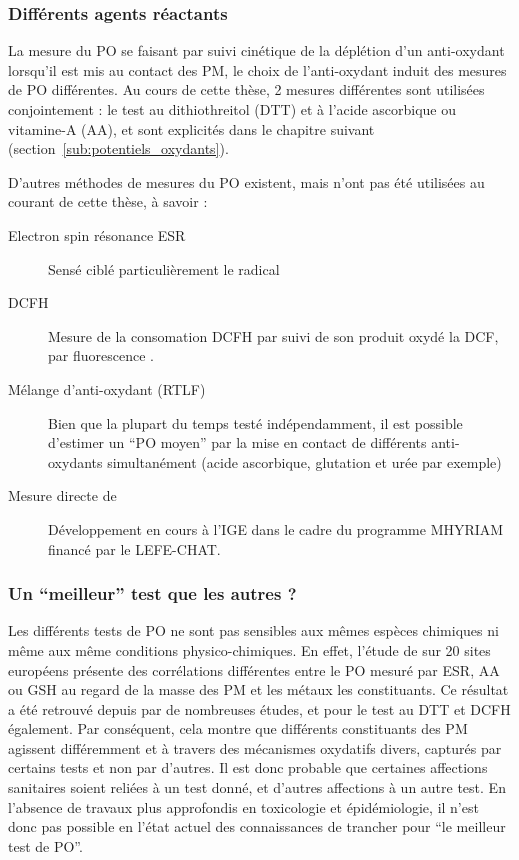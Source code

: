 \subsubsection{Différents agents réactants}%
\label{ssub:differents_agent_reactant}

La mesure du PO se faisant par suivi cinétique de la déplétion d'un anti-oxydant
lorsqu'il est mis au contact des PM, le choix de l'anti-oxydant induit des mesures de PO
différentes. Au cours de cette thèse, 2 mesures différentes sont utilisées conjointement :
le test au dithiothreitol (DTT) et à l'acide ascorbique ou vitamine-A (AA), et sont
explicités dans le chapitre suivant (section~\ref{sub:potentiels_oxydants}).

D'autres méthodes de mesures du PO existent, mais n'ont pas été utilisées au courant de
cette thèse, à savoir :
\begin{description}
    \item[Electron spin résonance ESR] Sensé ciblé particulièrement le radical
         \autocite{shiHydroxyl2003,shiTemporal2003}
    \item[DCFH] Mesure de la consomation DCFH par suivi de son produit oxydé la DCF, par
        fluorescence \parencite{foucaudMeasurement2007}.
    \item[Mélange d'anti-oxydant (RTLF)] Bien que la plupart du temps testé indépendamment, il est
        possible d'estimer un ``PO moyen'' par la mise en contact de différents
        anti-oxydants simultanément (acide ascorbique, glutation et urée par
        exemple)~\autocite{mudwayDifferences2001,calasComparison2018}
    \item[Mesure directe de ] Développement en cours à l'IGE dans le cadre du
        programme MHYRIAM financé par le LEFE-CHAT.
\end{description}

\subsubsection{Un ``meilleur'' test que les autres ?}%
\label{ssub:un_meilleur_test_que_les_autres_}

Les différents tests de PO ne sont pas sensibles aux mêmes espèces chimiques ni même aux même
conditions physico-chimiques. En effet, l'étude de \cite{kunzliComparison2006} sur 20
sites européens présente des corrélations différentes entre le PO mesuré par ESR, AA ou
GSH au regard de la masse des PM et les métaux les constituants.
Ce résultat a été retrouvé depuis par de nombreuses études, et pour le test au DTT et DCFH
également. Par conséquent, cela montre que différents constituants des PM agissent
différemment et à travers des mécanismes oxydatifs divers, capturés par certains tests et
non par d'autres.
Il est donc probable que certaines affections sanitaires soient reliées à un test donné, et
d'autres affections à un autre test. En l'absence de travaux plus approfondis en toxicologie
et épidémiologie, il n'est donc pas possible en l'état actuel des connaissances de trancher
pour ``le meilleur test de PO''.

